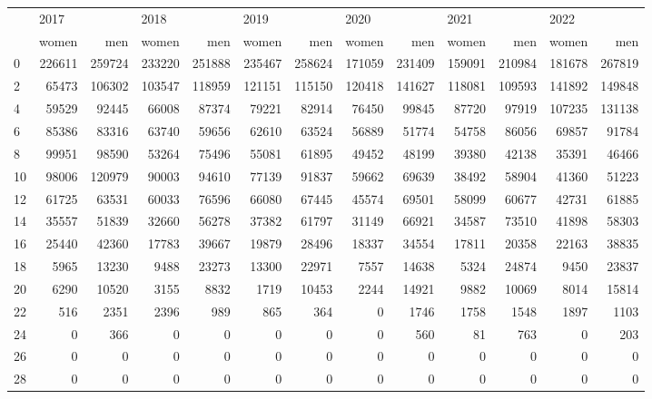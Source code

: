 \begin{tabular}{lrrrrrrrrrrrr}
\toprule
{} & \multicolumn{2}{l}{2017} & \multicolumn{2}{l}{2018} & \multicolumn{2}{l}{2019} & \multicolumn{2}{l}{2020} & \multicolumn{2}{l}{2021} & \multicolumn{2}{l}{2022} \\
{} &   women &     men &   women &     men &   women &     men &   women &     men &   women &     men &   women &     men \\
\midrule
0  &  226611 &  259724 &  233220 &  251888 &  235467 &  258624 &  171059 &  231409 &  159091 &  210984 &  181678 &  267819 \\
2  &   65473 &  106302 &  103547 &  118959 &  121151 &  115150 &  120418 &  141627 &  118081 &  109593 &  141892 &  149848 \\
4  &   59529 &   92445 &   66008 &   87374 &   79221 &   82914 &   76450 &   99845 &   87720 &   97919 &  107235 &  131138 \\
6  &   85386 &   83316 &   63740 &   59656 &   62610 &   63524 &   56889 &   51774 &   54758 &   86056 &   69857 &   91784 \\
8  &   99951 &   98590 &   53264 &   75496 &   55081 &   61895 &   49452 &   48199 &   39380 &   42138 &   35391 &   46466 \\
10 &   98006 &  120979 &   90003 &   94610 &   77139 &   91837 &   59662 &   69639 &   38492 &   58904 &   41360 &   51223 \\
12 &   61725 &   63531 &   60033 &   76596 &   66080 &   67445 &   45574 &   69501 &   58099 &   60677 &   42731 &   61885 \\
14 &   35557 &   51839 &   32660 &   56278 &   37382 &   61797 &   31149 &   66921 &   34587 &   73510 &   41898 &   58303 \\
16 &   25440 &   42360 &   17783 &   39667 &   19879 &   28496 &   18337 &   34554 &   17811 &   20358 &   22163 &   38835 \\
18 &    5965 &   13230 &    9488 &   23273 &   13300 &   22971 &    7557 &   14638 &    5324 &   24874 &    9450 &   23837 \\
20 &    6290 &   10520 &    3155 &    8832 &    1719 &   10453 &    2244 &   14921 &    9882 &   10069 &    8014 &   15814 \\
22 &     516 &    2351 &    2396 &     989 &     865 &     364 &       0 &    1746 &    1758 &    1548 &    1897 &    1103 \\
24 &       0 &     366 &       0 &       0 &       0 &       0 &       0 &     560 &      81 &     763 &       0 &     203 \\
26 &       0 &       0 &       0 &       0 &       0 &       0 &       0 &       0 &       0 &       0 &       0 &       0 \\
28 &       0 &       0 &       0 &       0 &       0 &       0 &       0 &       0 &       0 &       0 &       0 &       0 \\
\bottomrule
\end{tabular}
